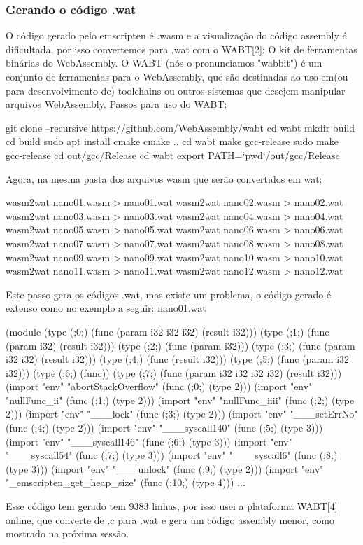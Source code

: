 \documentclass[12pt,a4paper,twoside]{article}
\begin{document}
\subsubsection{Gerando o código .wat}
O código gerado pelo emscripten é .wasm e a visualização do código assembly é dificultada, por isso convertemos para .wat com o WABT[2]: O kit de ferramentas binárias do WebAssembly.\newline
O WABT (nós o pronunciamos "wabbit") é um conjunto de ferramentas para o WebAssembly, que são destinadas ao uso em(ou para desenvolvimento de) toolchains ou outros sistemas que desejem manipular arquivos WebAssembly.\newline
Passos para uso do WABT:
\begin{terminal}
  git clone --recursive https://github.com/WebAssembly/wabt
  cd wabt
  mkdir build
  cd build
  sudo apt install cmake
  cmake ..
  cd wabt
  make gcc-release
  sudo make gcc-release
  cd out/gcc/Release
  cd wabt
  export PATH=`pwd`/out/gcc/Release
\end{terminal}
Agora, na mesma pasta dos arquivos wasm que serão convertidos em wat:
\begin{terminal}
  wasm2wat nano01.wasm > nano01.wat
  wasm2wat nano02.wasm > nano02.wat
  wasm2wat nano03.wasm > nano03.wat
  wasm2wat nano04.wasm > nano04.wat
  wasm2wat nano05.wasm > nano05.wat
  wasm2wat nano06.wasm > nano06.wat
  wasm2wat nano07.wasm > nano07.wat
  wasm2wat nano08.wasm > nano08.wat
  wasm2wat nano09.wasm > nano09.wat
  wasm2wat nano10.wasm > nano10.wat
  wasm2wat nano11.wasm > nano11.wat
  wasm2wat nano12.wasm > nano12.wat
\end{terminal}
Este passo gera os códigos .wat, mas existe um problema, o código gerado é extenso como no exemplo a seguir: \newline
nano01.wat
\begin{terminal}
(module
  (type (;0;) (func (param i32 i32 i32) (result i32)))
  (type (;1;) (func (param i32) (result i32)))
  (type (;2;) (func (param i32)))
  (type (;3;) (func (param i32 i32) (result i32)))
  (type (;4;) (func (result i32)))
  (type (;5;) (func (param i32 i32)))
  (type (;6;) (func))
  (type (;7;) (func (param i32 i32 i32 i32) (result i32)))
  (import "env" "abortStackOverflow" (func (;0;) (type 2)))
  (import "env" "nullFunc_ii" (func (;1;) (type 2)))
  (import "env" "nullFunc_iiii" (func (;2;) (type 2)))
  (import "env" "___lock" (func (;3;) (type 2)))
  (import "env" "___setErrNo" (func (;4;) (type 2)))
  (import "env" "___syscall140" (func (;5;) (type 3)))
  (import "env" "___syscall146" (func (;6;) (type 3)))
  (import "env" "___syscall54" (func (;7;) (type 3)))
  (import "env" "___syscall6" (func (;8;) (type 3)))
  (import "env" "___unlock" (func (;9;) (type 2)))
  (import "env" "_emscripten_get_heap_size" (func (;10;) (type 4)))
  ...
\end{terminal}
Esse código tem gerado tem 9383 linhas, por isso usei a plataforma WABT[4] online, que converte de .c para .wat e gera um código assembly menor, como mostrado na próxima sessão.
\end{document}
